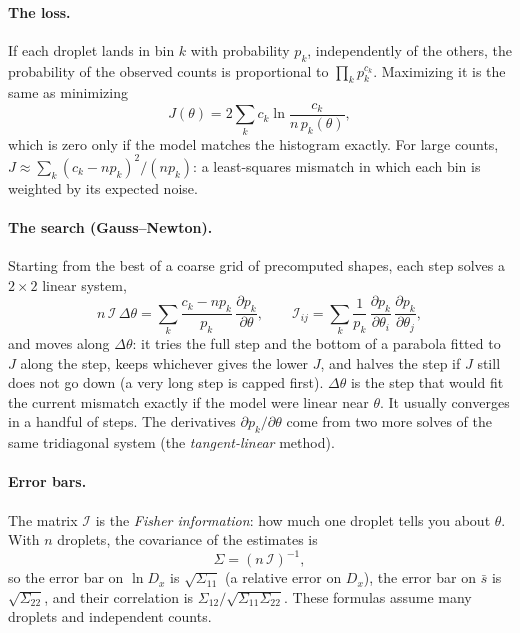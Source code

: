 \documentclass[11pt]{article}
\newcommand{\sbar}{\bar s}
\newcommand{\Dx}{D_x}
\newcommand{\Ical}{\mathcal{I}}
\begin{document}
\paragraph{The loss.} If each droplet lands in bin $k$ with probability $p_k$, independently of the others,
the probability of the observed counts is proportional to $\prod_k p_k^{c_k}$. Maximizing it is the same as
minimizing
\begin{equation}
J(\theta) = 2\sum_k c_k \ln\frac{c_k}{n\,p_k(\theta)} ,
\end{equation}
which is zero only if the model matches the histogram exactly. For large counts,
$J \approx \sum_k (c_k - n p_k)^2/(n p_k)$: a least-squares mismatch in which each bin is weighted by
its expected noise.

\paragraph{The search (Gauss--Newton).} Starting from the best of a coarse grid of precomputed shapes,
each step solves a $2\times2$ linear system,
\begin{equation}
n\,\Ical\,\Delta\theta = \sum_k \frac{c_k - n p_k}{p_k}\,\frac{\partial p_k}{\partial\theta},
\qquad
\Ical_{ij} = \sum_k \frac{1}{p_k}\,\frac{\partial p_k}{\partial\theta_i}\,\frac{\partial p_k}{\partial\theta_j},
\end{equation}
and moves along $\Delta\theta$: it tries the full step and the bottom of a parabola fitted to $J$ along the
step, keeps whichever gives the lower $J$, and halves the step if $J$ still does not go down (a very long
step is capped first). $\Delta\theta$ is the step that would
fit the current mismatch exactly if the model were linear near $\theta$. It usually converges in a handful
of steps. The derivatives $\partial p_k/\partial\theta$ come from two more solves of the same tridiagonal
system (the \emph{tangent-linear} method).

\paragraph{Error bars.} The matrix $\Ical$ is the \emph{Fisher information}: how much one droplet tells
you about $\theta$. With $n$ droplets, the covariance of the estimates is
\begin{equation}
\Sigma = (n\,\Ical)^{-1},
\end{equation}
so the error bar on $\ln\Dx$ is $\sqrt{\Sigma_{11}}$ (a relative error on $\Dx$), the error bar on $\sbar$
is $\sqrt{\Sigma_{22}}$, and their correlation is $\Sigma_{12}/\sqrt{\Sigma_{11}\Sigma_{22}}$. These
formulas assume many droplets and independent counts.
\end{document}
